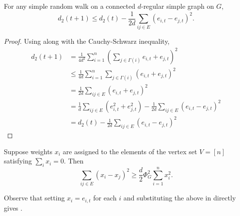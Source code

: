 \begin{lemma}
\label{random walk speed of convergence conductance lemma 1}
	For any simple random walk on a connected $d$-regular simple graph on $G$,
\[ d_2(t+1) \leq d_2(t) - \frac{1}{2d}\sum_{ij\in E}(e_{i,t}-e_{j,t})^2. \]
\end{lemma}
\begin{proof}
Using  along with the Cauchy-Schwarz inequality,
\begin{align*}
	d_2(t+1) &= \frac{1}{4d^2} \sum_{i=1}^n \left( \sum_{j\in\Gamma(i)} e_{i,t}+e_{j,t}\right)^2 \\
	&\leq \frac{1}{4d} \sum_{i=1}^n \sum_{j\in\Gamma(i)} (e_{i,t}+e_{j,t})^2 \\
	&= \frac{1}{2d} \sum_{ij\in E} (e_{i,t}+e_{j,t})^2 \\
	&= \frac{1}{d} \sum_{ij\in E} (e_{i,t}^2 + e_{j,t}^2) - \frac{1}{2d} \sum_{ij\in E}(e_{i,t}-e_{j,t})^2 \\
	&= d_2(t) - \frac{1}{2d} \sum_{ij\in E} (e_{i,t}-e_{j,t})^2
\end{align*}
\end{proof}

\begin{lemma}
Suppose weights $x_i$ are assigned to the elements of the vertex set $V=[n]$ satisfying $\sum_i x_i = 0$. Then
\[ \sum_{ij\in E} (x_i-x_j)^2 \geq \frac{d}{2}\Phi_G^2 \sum_{i=1}^n x_i^2. \]
\end{lemma}

Observe that setting $x_i=e_{i,t}$ for each $i$ and substituting the above in  directly gives .

